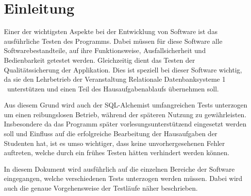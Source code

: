 
\chapter{Einleitung}

Einer der wichtigsten Aspekte bei der Entwicklung von Software ist das ausführliche Testen des Programms. Dabei müssen für diese Software alle Softwarebestandteile, auf ihre Funktionsweise, Ausfallsicherheit und Bedienbarkeit getestet werden. Gleichzeitig dient das Testen der Qualitätssicherung der Applikation. Dies ist speziell bei dieser Software wichtig, da sie den Lehrbetrieb der Veranstaltung \glqq Relationale Datenbanksysteme 1 \grqq~unterstützen und einen Teil des Hausaufgabenablaufs übernehmen soll.

Aus diesem Grund wird auch der SQL-Alchemist umfangreichen Tests unterzogen um einen reibungslosen Betrieb, während der späteren Nutzung zu gewährleisten. Insbesondere da das Programm später vorlesungsunterstützend eingesetzt werden soll und Einfluss auf die erfolgreiche Bearbeitung der Hausaufgaben der Studenten hat, ist es umso wichtiger, dass keine unvorhergesehenen Fehler auftreten, welche durch ein frühes Testen hätten verhindert werden können.

In diesem Dokument wird ausführlich auf die einzelnen Bereiche der Software eingegangen, welche verschiedenen Tests unterzogen werden müssen. Dabei wird auch die genaue Vorgehensweise der Testläufe näher beschrieben. 









